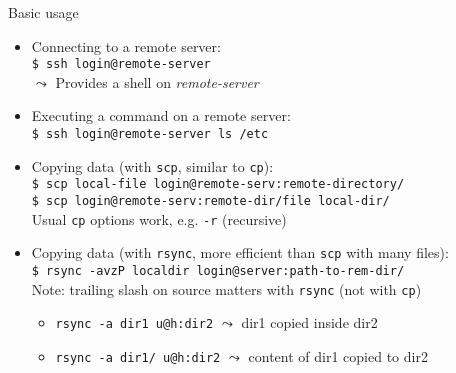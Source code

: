 \documentclass[11pt,final,usepdftitle=false]{beamer}
\begin{document}
\begin{frame}{Basic usage}
\begin{itemize}
\item Connecting to a remote server:\\
	\texttt{\$ ssh login@remote-server} \\
	$\leadsto$ Provides a shell on \textsl{remote-server}

\hbr
\item Executing a command on a remote server:\\
	\texttt{\$ ssh login@remote-server ls /etc}

\hbr
\item Copying data (with \texttt{scp}, similar to \texttt{cp}):\\
	\texttt{\$ scp local-file login@remote-serv:remote-directory/} \\
	\texttt{\$ scp login@remote-serv:remote-dir/file local-dir/}\\
	Usual \texttt{cp} options work, e.g. \texttt{-r} (recursive)
\hbr
\item Copying data (with \texttt{rsync}, more efficient than \texttt{scp} with many files):\\
	\texttt{\$ rsync -avzP localdir login@server:path-to-rem-dir/}\\
	\hbr
	Note: trailing slash on source matters with \texttt{rsync} (not with \texttt{cp})\\
	\begin{itemize}
		\item \texttt{rsync -a dir1 u@h:dir2}  $\leadsto$ dir1 copied inside dir2
		\item \texttt{rsync -a dir1/ u@h:dir2}  $\leadsto$ content of dir1 copied to dir2
	\end{itemize}
\end{itemize}
\end{frame}
\end{document}
